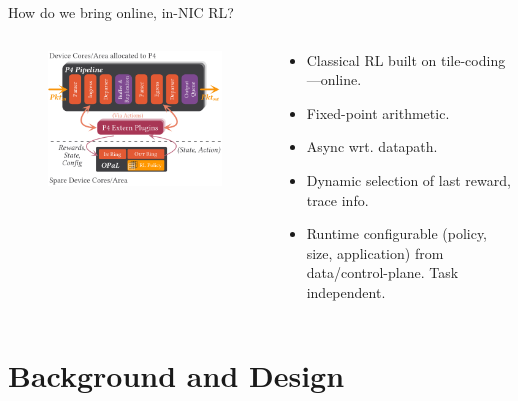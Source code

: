 \documentclass[aspectratio=169,xcolor={dvipsnames}
,handout
]{beamer}
\begin{document}
\begin{frame}{How do we bring online, in-NIC RL?}
	\begin{columns}
		\begin{column}{0.6\linewidth}
			\begin{figure}
				\includegraphics[width=\linewidth]{../paper/figures/arch-with-p4}
			\end{figure}
		\end{column}
		\begin{column}{0.4\linewidth}
			\begin{itemize}
				\item Classical RL built on tile-coding---\alert{online}.
				\item \alert{Fixed-point arithmetic}.
				\item Async wrt. datapath.
				\item Dynamic selection of last reward, trace info.
				\item \alert{Runtime configurable} (policy, size, application) from data/control-plane. \alert{Task independent.}
			\end{itemize}
		\end{column}
	\end{columns}
\end{frame}

\section{Background and Design}
\end{document}
